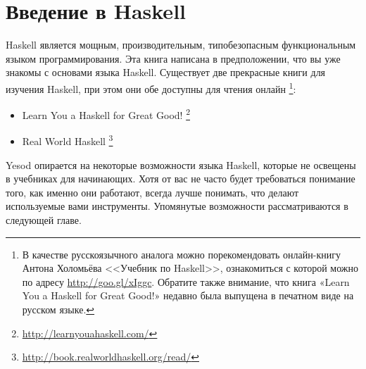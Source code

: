 \section{Введение в Haskell}

Haskell является мощным, производительным, типобезопасным функциональным языком
программирования. Эта книга написана в предположении, что вы уже знакомы с
основами языка Haskell. Существует две прекрасные книги для изучения Haskell,
при этом они обе доступны для чтения онлайн%
\footnote{В качестве русскоязычного аналога можно порекомендовать онлайн-книгу
    Антона Холомьёва <<Учебник по Haskell>>, ознакомиться с которой можно по
    адресу \href{http://goo.gl/xIggc}{http://goo.gl/xIggc}. Обратите также
    внимание, что книга «Learn You a Haskell for Great Good!» недавно была
    выпущена в печатном виде на русском языке.}:

\begin{itemize}
    \item Learn You a Haskell for Great Good!%
        \footnote{\href{http://learnyouahaskell.com/}{http://learnyouahaskell.com/}}
    \item Real World Haskell%
        \footnote{\href{http://book.realworldhaskell.org/read/}{http://book.realworldhaskell.org/read/}}
\end{itemize}

Yesod опирается на некоторые возможности языка Haskell, которые не освещены в
учебниках для начинающих. Хотя от вас не часто будет требоваться понимание
того, как именно они работают, всегда лучше понимать, что делают используемые
вами инструменты. Упомянутые возможности рассматриваются в следующей главе.
